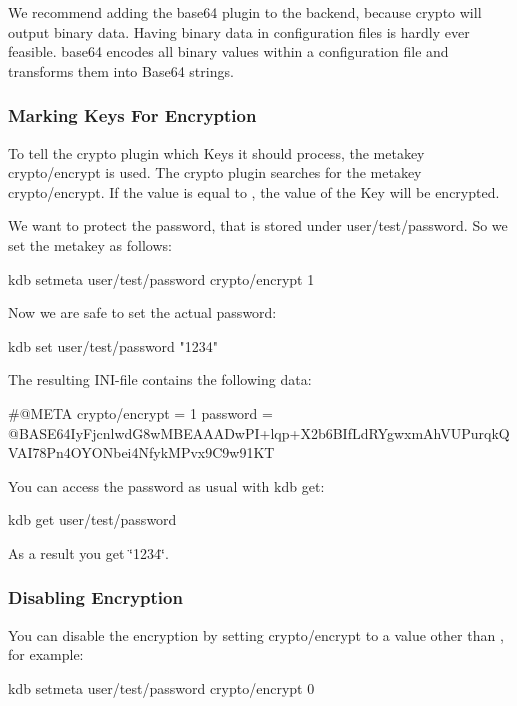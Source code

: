 We recommend adding the {\ttfamily base64} plugin to the backend, because {\ttfamily crypto} will output binary data. Having binary data in configuration files is hardly ever feasible. {\ttfamily base64} encodes all binary values within a configuration file and transforms them into Base64 strings.

\subsubsection*{Marking Keys For Encryption}

To tell the {\ttfamily crypto} plugin which Keys it should process, the metakey {\ttfamily crypto/encrypt} is used. The {\ttfamily crypto} plugin searches for the metakey {\ttfamily crypto/encrypt}. If the value is equal to {}, the value of the Key will be encrypted.

We want to protect the password, that is stored under {\ttfamily user/test/password}. So we set the metakey as follows\+: \begin{DoxyVerb}    kdb setmeta user/test/password crypto/encrypt 1
\end{DoxyVerb}


Now we are safe to set the actual password\+: \begin{DoxyVerb}    kdb set user/test/password "1234"
\end{DoxyVerb}


The resulting I\+N\+I-\/file contains the following data\+: \begin{DoxyVerb}    #@META crypto/encrypt = 1
    password = @BASE64IyFjcnlwdG8wMBEAAADwPI+lqp+X2b6BIfLdRYgwxmAhVUPurqkQVAI78Pn4OYONbei4NfykMPvx9C9w91KT
\end{DoxyVerb}


You can access the password as usual with {\ttfamily kdb get}\+: \begin{DoxyVerb}    kdb get user/test/password
\end{DoxyVerb}


As a result you get \char`\"{}1234\char`\"{}.

\subsubsection*{Disabling Encryption}

You can disable the encryption by setting {\ttfamily crypto/encrypt} to a value other than {}, for example\+: \begin{DoxyVerb}    kdb setmeta user/test/password crypto/encrypt 0
\end{DoxyVerb}


